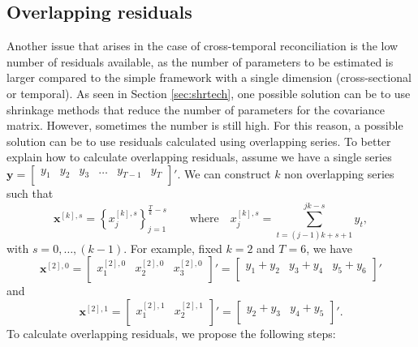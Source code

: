 \documentclass[a4paper,11pt]{article}
\newcommand{\xvet}{\bm{x}}
\newcommand{\yvet}{\bm{y}}
\theoremstyle{definition}
\begin{document}
\subsection{Overlapping residuals}\label{ssec:over_res}

Another issue that arises in the case of cross-temporal reconciliation is the low number of residuals available, as the number of parameters to be estimated is larger compared to the simple framework with a single dimension (cross-sectional or temporal). As seen in Section \ref{sec:shrtech}, one possible solution can be to use shrinkage methods that reduce the number of parameters for the covariance matrix. However, sometimes the number is still high. For this reason, a possible solution can be to use residuals calculated using overlapping series. To better explain how to calculate overlapping residuals, assume we have a single series
	$
	\yvet = \begin{bmatrix}
		y_1 & y_2 & y_3 & \dots & y_{T-1} & y_{T} \\
	\end{bmatrix}'.
	$
	We can construct $k$ non overlapping series such that
	$$
	\xvet^{[k], s} = \left\{x^{[k],s}_{j}\right\}_{j = 1}^{\frac{T}{k}-s} \qquad \mathrm{where} \quad x^{[k],s}_{j} = \sum_{t = (j-1)k+s+1}^{jk-s} y_t,
	$$
	with $s = 0, \dots, (k-1)$.
	For example, fixed $k = 2$ and $T = 6$, we have
	$$
	\xvet^{[2], 0} = \begin{bmatrix}
		x_1^{[2], 0} & x_2^{[2], 0} & x_{3}^{[2], 0}\\
	\end{bmatrix}' =\begin{bmatrix}
		y_1 + y_2 & y_3 + y_4 & y_5 + y_6\\
	\end{bmatrix}'
	$$
	and
	$$
	\xvet^{[2], 1} = \begin{bmatrix}
		x_1^{[2], 1} & x_2^{[2], 1}\\
	\end{bmatrix}' =\begin{bmatrix}
		y_2 + y_3 & y_4 + y_5\\
	\end{bmatrix}'.
	$$
To calculate overlapping residuals, we propose the following steps:
\end{document}
